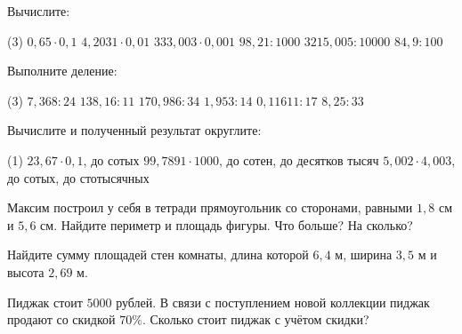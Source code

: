 \begin{homework}[number=4]
	\begin{listofex}
		\item Вычислите: \begin{tasks}(3)
			\task \( 0,65\cdot0,1 \)
			\task \( 4,2031\cdot0,01 \)
			\task \( 333,003\cdot0,001 \)
			\task \( 98,21:1000 \)
			\task \( 3215,005:10000 \)
			\task \( 84,9:100 \)
		\end{tasks}
		\item Выполните деление:
		\begin{tasks}(3)
			\task \( 7,368: 24 \)
			\task \( 138,16:11 \) 
			\task \( 170,986:34 \)  
			\task \( 1,953:14 \)  
			\task \( 0,11611:17 \)  
			\task \( 8,25:33 \)  
		\end{tasks}
		\item Вычислите и полученный результат округлите: 
		\begin{tasks}(1)
			\task \( 23,67\cdot 0,1 \), до сотых
			\task \( 99,7891\cdot 1000  \), до сотен, до десятков тысяч
			\task \( 5,002 \cdot4,003 \), до сотых, до стотысячных
		\end{tasks}
		\item Максим построил у себя в тетради прямоугольник со сторонами, равными \( 1,8 \) см и \( 5,6 \) см. Найдите периметр и площадь фигуры. Что больше? На сколько?
		\item Найдите сумму площадей стен комнаты, длина которой \( 6,4 \) м, ширина \( 3,5 \) м и высота \( 2,69 \) м. 
		\item  Пиджак стоит \( 5000 \) рублей. В связи с поступлением новой коллекции пиджак продают со скидкой \( 70\% \). Сколько стоит пиджак с учётом скидки?
	\end{listofex}
\end{homework}

